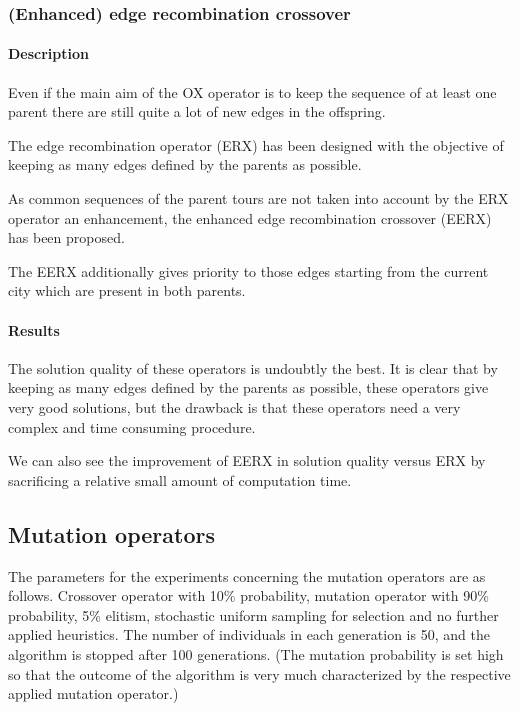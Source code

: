 ﻿\documentclass[a4paper,english,11pt,]{scrartcl}
\begin{document}
% 

\subsubsection{(Enhanced) edge recombination crossover}
\paragraph{Description}
Even if the main aim of the OX operator is to keep the sequence of at
least one parent there are still quite a lot of new edges in the offspring.

The edge recombination operator (ERX) has been designed with the
objective of keeping as many edges defined by the parents as possible.

As common sequences of the parent tours are not taken into account by
the ERX operator an enhancement, the enhanced
edge recombination crossover (EERX) has been proposed.

The EERX additionally gives priority to those edges starting from the
current city which are present in both parents.

\paragraph{Results}

The solution quality of these operators is undoubtly the best. It is clear that by keeping as many edges defined by the parents as possible, these operators give very good solutions, but the drawback is that these operators need a very complex and time consuming procedure.

We can also see the improvement of EERX in solution quality versus ERX by sacrificing a relative small amount of computation time.
% 

% 



\subsection{Mutation operators}
The parameters for the experiments concerning the mutation operators are as follows. Crossover operator with 10\% probability, mutation operator with 90\% probability, 5\% elitism, stochastic uniform sampling for selection and no further applied heuristics. The number of individuals in each generation is 50, and the algorithm is stopped after 100 generations. 
(The mutation probability is set high so that the outcome of the algorithm is very much characterized by the respective applied mutation operator.)
\end{document}

